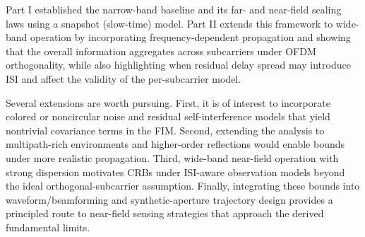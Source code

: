 \documentclass[9pt,final,journal,twocolumn]{IEEEtran}
\begin{document}
Part I established the narrow-band baseline and its far- and near-field scaling laws using a snapshot (slow-time) model. Part II extends this framework to wide-band operation by incorporating frequency-dependent propagation and showing that the overall information aggregates across subcarriers under OFDM orthogonality, while also highlighting when residual delay spread may introduce ISI and affect the validity of the per-subcarrier model. 

Several extensions are worth pursuing. First, it is of interest to incorporate colored or noncircular noise and residual self-interference models that yield nontrivial covariance terms in the FIM. Second, extending the analysis to multipath-rich environments and higher-order reflections would enable bounds under more realistic propagation. Third, wide-band near-field operation with strong dispersion motivates CRBs under ISI-aware observation models beyond the ideal orthogonal-subcarrier assumption. Finally, integrating these bounds into waveform/beamforming and synthetic-aperture trajectory design provides a principled route to near-field sensing strategies that approach the derived fundamental limits.
\end{document}

